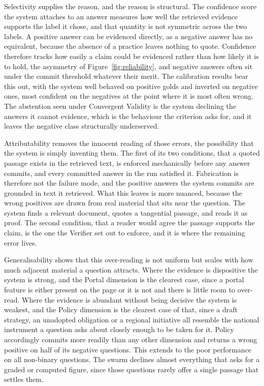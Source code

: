 Selectivity supplies the reason, and the reason is structural. The confidence score the system attaches to an answer measures how well the retrieved evidence supports the label it chose, and that quantity is not symmetric across the two labels. A positive answer can be evidenced directly, as a negative answer has no equivalent, because the absence of a practice leaves nothing to quote. Confidence therefore tracks how easily a claim could be evidenced rather than how likely it is to hold, the asymmetry of Figure~\ref{fig:reliability}, and negative answers often sit under the commit threshold whatever their merit. The calibration results bear this out, with the system well behaved on positive golds and inverted on negative ones, most confident on the negatives at the point where it is most often wrong. The abstention seen under Convergent Validity is the system declining the answers it cannot evidence, which is the behaviour the criterion asks for, and it leaves the negative class structurally underserved.

Attributability removes the innocent reading of those errors, the possibility that the system is simply inventing them. The first of its two conditions, that a quoted passage exists in the retrieved text, is enforced mechanically before any answer commits, and every committed answer in the run satisfied it. Fabrication is therefore not the failure mode, and the positive answers the system commits are grounded in text it retrieved. What this leaves is more nuanced, because the wrong positives are drawn from real material that sits near the question. The system finds a relevant document, quotes a tangential passage, and reads it as proof. The second condition, that a reader would agree the passage supports the claim, is the one the Verifier set out to enforce, and it is where the remaining error lives.

Generalisability shows that this over-reading is not uniform but scales with how much adjacent material a question attracts. Where the evidence is dispositive the system is strong, and the Portal dimension is the clearest case, since a portal feature is either present on the page or it is not and there is little room to over-read. Where the evidence is abundant without being decisive the system is weakest, and the Policy dimension is the clearest case of that, since a draft strategy, an unadopted obligation or a regional initiative all resemble the national instrument a question asks about closely enough to be taken for it. Policy accordingly commits more readily than any other dimension and returns a wrong positive on half of its negative questions. This extends to the poor performance on all non-binary questions. The swarm declines almost everything that asks for a graded or computed figure, since those questions rarely offer a single passage that settles them.


